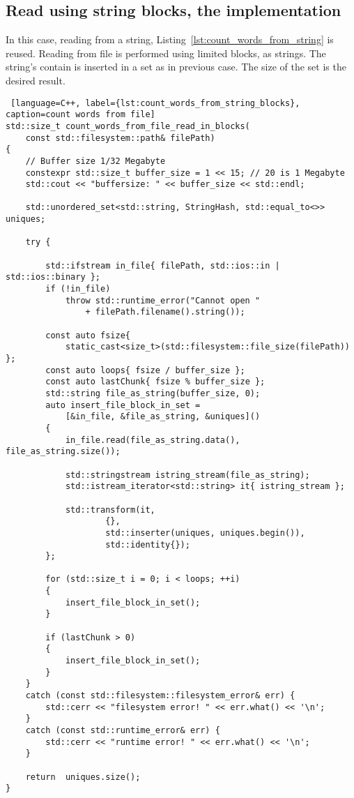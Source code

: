 \documentclass{article}
\begin{document}
\subsection{Read using string blocks, the implementation}

In this case, reading from a string, Listing~\ref{lst:count_words_from_string} is reused. Reading from file is performed using limited blocks, as strings. The string's contain is inserted in a set as in previous case. The size of the set is the desired result.

\begin{lstlisting} [language=C++, label={lst:count_words_from_string_blocks}, caption=count words from file]
std::size_t count_words_from_file_read_in_blocks(
	const std::filesystem::path& filePath)
{
    // Buffer size 1/32 Megabyte
    constexpr std::size_t buffer_size = 1 << 15; // 20 is 1 Megabyte
    std::cout << "buffersize: " << buffer_size << std::endl;

    std::unordered_set<std::string, StringHash, std::equal_to<>> uniques;
 
    try {
        
        std::ifstream in_file{ filePath, std::ios::in | std::ios::binary };
        if (!in_file)
            throw std::runtime_error("Cannot open " 
            	+ filePath.filename().string());

        const auto fsize{ 
        	static_cast<size_t>(std::filesystem::file_size(filePath)) };
        const auto loops{ fsize / buffer_size };
        const auto lastChunk{ fsize % buffer_size };
        std::string file_as_string(buffer_size, 0);
        auto insert_file_block_in_set = 
        	[&in_file, &file_as_string, &uniques]()
        {
            in_file.read(file_as_string.data(), file_as_string.size());

            std::stringstream istring_stream(file_as_string);
            std::istream_iterator<std::string> it{ istring_stream };

            std::transform(it, 
            		{}, 
            		std::inserter(uniques, uniques.begin()), 
            		std::identity{});
        };

        for (std::size_t i = 0; i < loops; ++i) 
        {
            insert_file_block_in_set();
        }
        
        if (lastChunk > 0)
        {
            insert_file_block_in_set();
        }
    }
    catch (const std::filesystem::filesystem_error& err) {
        std::cerr << "filesystem error! " << err.what() << '\n';
    }
    catch (const std::runtime_error& err) {
        std::cerr << "runtime error! " << err.what() << '\n';
    }

    return  uniques.size();
}

\end{lstlisting}
\end{document}
